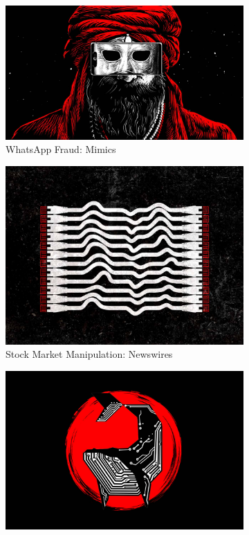 \documentclass[11pt]{article}
\begin{document}
\begin{figure}[ht]
    \centering
    \begin{subfigure}{.3\textwidth}
      \centering
      \includegraphics[width=\linewidth]{maskedphone.jpg}
      \caption{WhatsApp Fraud: Mimics}
      \label{fig:sub1}
    \end{subfigure}%
    \begin{subfigure}{.3\textwidth}
      \centering
      \includegraphics[width=\linewidth]{wires.jpg}
      \caption{Stock Market Manipulation: Newswires}
      \label{fig:sub2}
    \end{subfigure}
    \begin{subfigure}{.3\textwidth}
      \centering
      \includegraphics[width=\linewidth]{whale.jpg}

\end{subfigure}
\end{figure}
\end{document}
